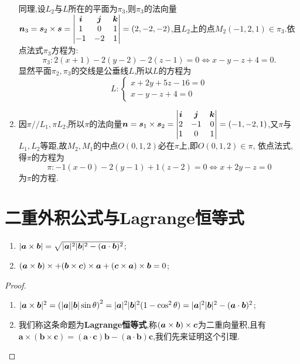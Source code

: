 \begin{solution}
\begin{enumerate}
    同理,设$L_2$与$L$所在的平面为$\pi_3$,则$\pi_3$的法向量$\bm{n}_3 = \bm{s}_2 \times \bm{s} = \begin{vmatrix}
        \bm{i} & \bm{j} & \bm{k} \\
        1 & 0 & 1 \\
        -1 & -2 & 1
    \end{vmatrix} = (2,-2,-2)$,且$L_2$上的点$M_2(-1,2,1) \in \pi_3$.依点法式$\pi_3$方程为:
    $$
    \pi_3: 2(x+1)-2(y-2)-2(z-1) = 0 \Leftrightarrow x-y-z+4=0.
    $$
    显然平面$\pi_2, \pi_3$的交线是公垂线$L$,所以$L$的方程为
    $$
    L: \begin{cases}
        x+2y+5z-16 = 0 \\
        x-y-z+4 = 0
    \end{cases}
    $$

    \item 因$\pi // L_1, \pi L_2$,所以$\pi$的法向量$\bm{n} = \bm{s}_1 \times \bm{s}_2 = \begin{vmatrix}
        \bm{i} & \bm{j} & \bm{k} \\
        2 & -1 & 0 \\
        1 & 0 & 1
    \end{vmatrix} = (-1,-2,1)$,又$\pi$与$L_1,L_2$等距,故$M_2,M_1$的中点$O(0,1,2)$必在$\pi$上,即$O(0,1,2) \in \pi$,
    依点法式,得$\pi$的方程为
    $$
    \pi: -1(x-0)-2(y-1)+1(z-2) = 0 \Leftrightarrow x+2y-z =0
    $$
    为$\pi$的方程.
\end{enumerate}
\end{solution}

\section{二重外积公式与Lagrange恒等式}

\begin{proposition}

    \begin{enumerate}
        \item $|\bm{a} \times \bm{b}| = \sqrt{|\bm{a}|^2|\bm{b}|^2 - (\bm{a} \cdot \bm{b})^2}$;
        \item $(\bm{a} \times \bm{b}) \times + (\bm{b} \times \bm{c}) \times \bm{a} + (\bm{c} \times \bm{a}) \times \bm{b} = 0$;
    \end{enumerate}

\end{proposition}

\begin{proof}
    \begin{enumerate}
        \item $|\bm{a} \times \bm{b}|^2 = \left( |\bm{a}| |\bm{b}| \sin \theta \right)^2 = |\bm{a}|^2 |\bm{b}|^2 (1-\cos^2 \theta) = |\bm{a}|^2 |\bm{b}|^2 - (\bm{a} \cdot \bm{b})^2$;
        \item 我们称这条命题为\textbf{Lagrange恒等式},称$(\bm{a} \times \bm{b}) \times \bm{c}$为二重向量积,且有$\bm{a} \times (\bm{b} \times \bm{c}) = (\bm{a} \cdot \bm{c})\bm{b} - (\bm{a} \cdot \bm{b})\bm{c}$,我们先来证明这个引理.
    \end{enumerate}
\end{proof}

